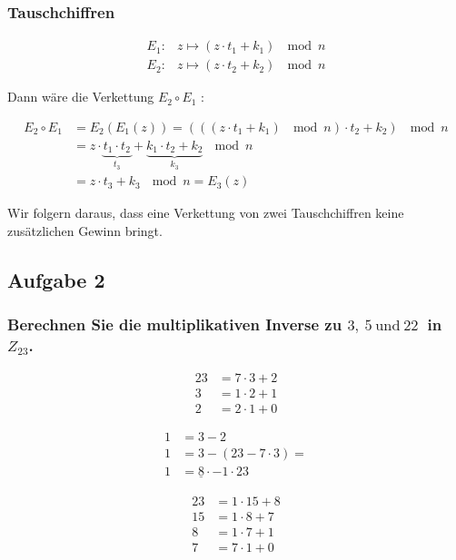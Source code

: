 \subsubsection{Tauschchiffren}

\begin{align}
	E_1: & z \mapsto (z \cdot t_1 + k_1)~\mod n \\
	E_2: & z \mapsto (z \cdot  t_2 + k_2)~\mod n 
\end{align}

Dann wäre die Verkettung $ E_2 \circ E_1 $ :

\begin{align}
	E_2 \circ E_1 & = E_2(E_1(z)) =  (((z  \cdot t_1 + k_1)~\mod n)  \cdot t_2 +k_2)~\mod n \\
	              & = z \cdot \underbrace{t_1 \cdot t_2}_{t_3} + \underbrace{k_1 \cdot t_2 + k_2}_{k_3} ~\mod n \\
	              & = z \cdot t_3 + k_3~\mod n = E_3(z)
\end{align}

Wir folgern daraus, dass eine Verkettung von zwei Tauschchiffren keine zusätzlichen Gewinn bringt.

\subsection{Aufgabe 2}

\subsubsection*{Berechnen Sie die multiplikativen Inverse zu $3,~5 ~\text{und} ~22~$ in $Z_23$.}

\begin{align*}
	23 & = 7 \cdot 3 + 2 \\
     3 & = 1 \cdot 2 + 1 \\
     2 & = 2 \cdot 1 + 0 
\end{align*}

\begin{align*}
	 1 & = 3 - 2 \\
     1 & = 3 - (23 - 7 \cdot 3 ) = \\
     1 & = \underline{8} \cdot - 1 \cdot 23    
\end{align*}


\begin{align*}
	23 & = 1 \cdot 15 + 8 \\
    15 & = 1 \cdot 8 + 7 \\
     8 & = 1 \cdot 7 + 1 \\     
     7 & = 7 \cdot 1 + 0     
\end{align*}

